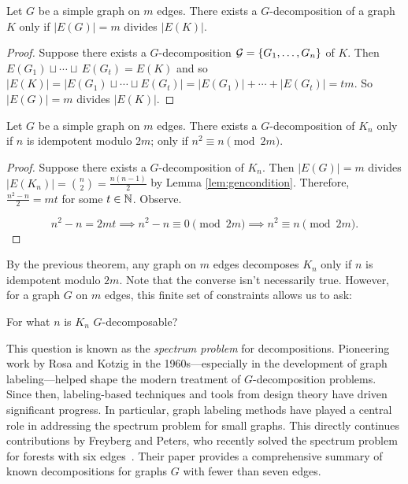 \begin{lemma} \label{lem:gencondition}
  Let $G$ be a simple graph on $m$ edges. There exists a $G$-decomposition of a graph $K$ only if $|E(G)|=m$ divides $|E(K)|$. 
\end{lemma}

  \begin{proof}
  Suppose there exists a $G$-decomposition $\mathcal{G} =\{G_{1},\hdots, G_{n}\}$ of $K$. Then $E(G_{1})\sqcup \cdots \sqcup\,E(G_{t})=E(K)$ and so $|E(K)|=|E(G_{1})\sqcup \cdots \sqcup E(G_{t})|=|E(G_{1})|+ \cdots + |E(G_{t})|=tm$. So $|E(G)|=m$ divides $|E(K)|$.
  \end{proof}

\begin{thm} \label{thm:Kncondition}
  Let $G$ be a simple graph on $m$ edges. There exists a $G$-decomposition of $K_{n}$ only if $n$ is idempotent modulo $2m$; only if $n^{2}\equiv n\pmod{2m}$.
\end{thm}

\begin{proof}
  Suppose there exists a $G$-decomposition of $K_{n}$. Then $|E(G)|=m$ divides $|E(K_{n})|=\binom{n}{2}=\frac{n(n-1)}{2}$ by Lemma \ref{lem:gencondition}. Therefore, $\frac{n^{2}-n}{2}=mt$ for some $t\in \mathbb{N}$. Observe.

  $$n^{2}-n= 2mt\implies n^{2}-n\equiv 0\pmod{2m}\implies n^{2}\equiv n\pmod{2m}.$$
\end{proof}
By the previous theorem, any graph on $m$ edges decomposes $K_{n}$ only if $n$ is idempotent modulo $2m$. Note that the converse isn't necessarily true. However, for a graph $G$ on $m$ edges, this finite set of constraints allows us to ask:
\begin{center}
For what $n$ is $K_{n}$ $G$-decomposable?
\end{center}
This question is known as the \textit{spectrum problem} for decompositions. Pioneering work by Rosa and Kotzig in the 1960s—especially in the development of graph labeling—helped shape the modern treatment of $G$-decomposition problems. Since then, labeling-based techniques and tools from design theory have driven significant progress. In particular, graph labeling methods have played a central role in addressing the spectrum problem for small graphs. This directly continues contributions by Freyberg and Peters, who recently solved the spectrum problem for forests with six edges~\cite{bib:Peters}. Their paper provides a comprehensive summary of known decompositions for graphs $G$ with fewer than seven edges.

